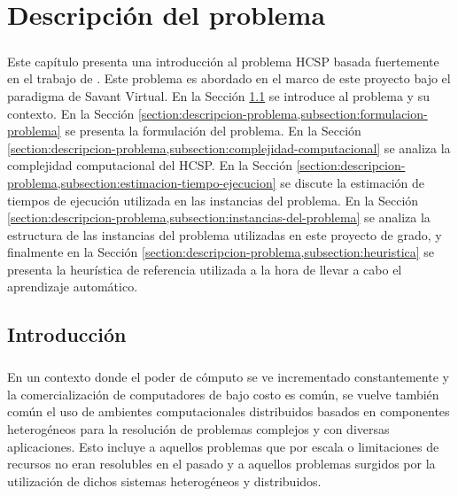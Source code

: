 \chapter{Descripción del problema} \label{section-descripcion-problema}

\paragraph{}Este capítulo presenta una introducción al problema HCSP basada fuertemente en el trabajo de \citet{bib-doctorado-nesmachnow}.
Este problema es abordado en el marco de este proyecto bajo el paradigma de Savant Virtual.
En la Sección \ref{section:descripcion-problema,subsection:introduccion} se introduce al problema y su contexto. En la Sección \ref{section:descripcion-problema,subsection:formulacion-problema} se presenta la formulación del problema. En la Sección \ref{section:descripcion-problema,subsection:complejidad-computacional} se analiza la complejidad computacional del HCSP. En la Sección \ref{section:descripcion-problema,subsection:estimacion-tiempo-ejecucion} se discute la estimación de tiempos de ejecución utilizada en las instancias del problema. En la Sección \ref{section:descripcion-problema,subsection:instancias-del-problema} se analiza la estructura de las instancias del problema utilizadas en este proyecto de grado, y finalmente en la Sección \ref{section:descripcion-problema,subsection:heuristica} se presenta la heurística de referencia utilizada a la hora de llevar a cabo el aprendizaje automático.

\section{Introducción} \label{section:descripcion-problema,subsection:introduccion}

 
\paragraph{}En un contexto donde el poder de cómputo se ve incrementado constantemente y la comercialización de computadores de bajo costo es común, se vuelve también común el uso de ambientes computacionales distribuidos basados en componentes heterogéneos para la resolución de problemas complejos y con diversas aplicaciones.
Esto incluye a aquellos problemas que por escala o limitaciones de recursos no eran resolubles en el pasado y a aquellos problemas surgidos por la utilización de dichos sistemas heterogéneos y distribuidos. 

